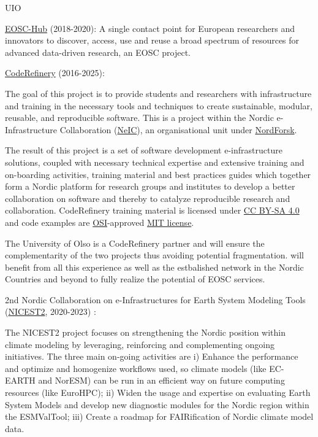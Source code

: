 \begin{sitedescription}{UIO}
\begin{compactenum}
    \item \href{https://www.eosc-hub.eu}{EOSC-Hub} \label{desc:eoschub} (2018-2020):
    A single contact point for European researchers and innovators to discover, access, use and reuse a broad spectrum of resources for advanced data-driven research, an EOSC project.
    
    \item \href{https://coderefinery.org}{CodeRefinery} \label{desc:coderefinery} (2016-2025): 
    
    The goal of this project is to provide students and researchers with infrastructure and training in the necessary tools and techniques to create sustainable, modular, reusable, and reproducible software.
    This is a project within the Nordic e-Infrastructure Collaboration (\href{https://neic.no}{NeIC}), an organisational unit under \href{https://www.nordforsk.org/en}{NordForsk}.
    
    The result of this project is a set of software development e-infrastructure solutions, coupled with necessary technical expertise and extensive training and on-boarding activities, training material and best practices guides which together form a Nordic platform for research groups and institutes to develop a better collaboration on software and thereby to catalyze reproducible research and collaboration.
    \newline
    CodeRefinery training material is licensed under \href{https://creativecommons.org/licenses/by-sa/4.0/}{CC BY-SA 4.0} and code examples are \href{https://opensource.org/}{OSI}-approved \href{https://opensource.org/licenses/mit-license.html}{MIT license}.
    
    The University of Olso is a CodeRefinery partner and will ensure the complementarity of the two projects thus avoiding potential fragmentation. \TheProject will benefit from all this experience as well as the estbalished network in the Nordic Countries and beyond to fully realize the potential of \TheProject EOSC services. 
    \newline
    
    
    \item 2nd Nordic Collaboration on e-Infrastructures for Earth System Modeling Tools (\href{https://neic.no/nicest2}{NICEST2}, 2020-2023) \label{desc:nicest2}:
    
    The NICEST2 project focuses on strengthening the Nordic position within climate modeling by leveraging, reinforcing and complementing ongoing initiatives. The three main on-going activities are i) Enhance the performance and optimize and homogenize workflows used, so climate models (like EC-EARTH and NorESM) can be run in an efficient way on future computing resources (like EuroHPC); ii) Widen the usage and expertise on evaluating Earth System Models and develop new diagnostic modules for the Nordic region within the ESMValTool; iii) Create a roadmap for FAIRification of Nordic climate model data.
    

\end{compactenum}
\end{sitedescription}
